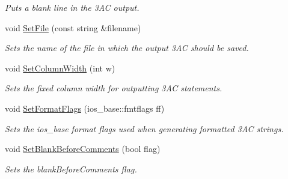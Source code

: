 \begin{DoxyCompactItemize}
\begin{DoxyCompactList}\small\item\em Puts a blank line in the 3\-A\-C output. \end{DoxyCompactList}\item 
void \hyperlink{classTAC__Generator_a1c8e7f2ace8e7e96b4a2a1909ca054fe}{Set\-File} (const string \&filename)
\begin{DoxyCompactList}\small\item\em Sets the name of the file in which the output 3\-A\-C should be saved. \end{DoxyCompactList}\item 
void \hyperlink{classTAC__Generator_a2268378a805c9722cf4693e97b67166e}{Set\-Column\-Width} (int w)
\begin{DoxyCompactList}\small\item\em Sets the fixed column width for outputting 3\-A\-C statements. \end{DoxyCompactList}\item 
void \hyperlink{classTAC__Generator_aacd4a0f0dd9c2cc79da4cf9d9d1e442e}{Set\-Format\-Flags} (ios\-\_\-base\-::fmtflags ff)
\begin{DoxyCompactList}\small\item\em Sets the ios\-\_\-base format flags used when generating formatted 3\-A\-C strings. \end{DoxyCompactList}\item 
void \hyperlink{classTAC__Generator_a6d909e88feeb387d89ee154aeb6466f2}{Set\-Blank\-Before\-Comments} (bool flag)
\begin{DoxyCompactList}\small\item\em Sets the blank\-Before\-Comments flag. \end{DoxyCompactList}\end{DoxyCompactItemize}

